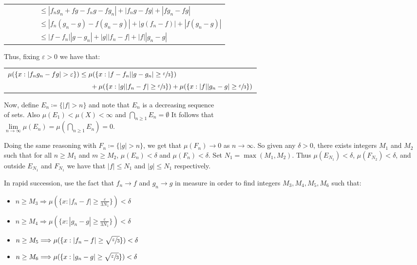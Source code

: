 \documentclass{book}
\newcommand{\exPP}{%
   \color{RedViolet}%
   \fontsize{12}{14}\selectfont%
}
\newenvironment{myIndent}{%
   \begin{adjustwidth}{2.5em}{0em}%
}{%
   \end{adjustwidth}%
}
\newcommand{\retTwo}{\hfill\bigbreak}
\begin{document}
\begin{enumerate}
\begin{myIndent}
{\begin{tabular}{l}
			$\phantom{|f_ng_n - fg|} \leq |f_ng_n + fg - f_ng - fg_n| + |f_ng - fg| + |fg_n - fg|$\\ [3pt]

			$\phantom{|f_ng_n - fg|} \leq |f_n(g_n - g) - f(g_n - g)| + |g(f_n - f)| + |f(g_n - g)|$\\ [3pt]

			$\phantom{|f_ng_n - fg|} \leq |f - f_n||g - g_n| + |g||f_n - f| + |f||g_n - g|$
		\end{tabular} \retTwo\par}

		Thus, fixing $\varepsilon > 0$ we have that:

		{\centering\exPP
		\begin{tabular}{l}
			$\mu(\{x : |f_ng_n - fg| > \varepsilon\}) \leq \mu(\{x : |f - f_n||g - g_n| \geq \sfrac{\varepsilon}{3}\})$\\
			$\phantom{\mu(\{x : |f_ng_n - fg| > \varepsilon\}) aaa} + \mu(\{x : |g||f_n - f| \geq \sfrac{\varepsilon}{3}\}) + \mu(\{x : |f||g_n - g| \geq \sfrac{\varepsilon}{3}\})$
		\end{tabular} \retTwo\par}

		Now, define $E_n \coloneq \{|f| > n\}$ and note that $E_n$ is a decreasing sequence\\ of sets. Also $\mu(E_1) < \mu(X) < \infty$ and $\bigcap\limits_{n \geq 1} E_n = \emptyset$ It follows that\\ [-8pt] $\lim\limits_{n \rightarrow \infty}\mu(E_n) = \mu(\bigcap\limits_{n \geq 1} E_n) = 0$.\retTwo

		Doing the same reasoning with $F_n \coloneq \{|g| > n\}$, we get that $\mu(F_n) \rightarrow 0$ as $n \rightarrow \infty$. So given any $\delta > 0$, there exists integers $M_1$ and $M_2$ such that for all $n \geq M_1$ and $m \geq M_2$, $\mu(E_n) < \delta$ and $\mu(F_n) < \delta$. Set $N_1 = \max(M_1, M_2)$. Thus $\mu(E_{N_1}) < \delta$, $\mu(F_{N_2}) < \delta$, and outside $E_{N_1}$ and $F_{N_1}$ we have that $|f| \leq N_1$ and $|g| \leq N_1$ respectively.\retTwo

		In rapid succession, use the fact that $f_n \rightarrow f$ and $g_n \rightarrow g$ in measure in order to find integers $M_3, M_4, M_5, M_6$ such that:

		\begin{itemize}
			\item $n \geq M_3 \Longrightarrow \mu(\{x : |f_n - f| \geq \frac{\varepsilon}{3N_1}\}) < \delta$
			\item $n \geq M_4 \Longrightarrow \mu(\{x : |g_n - g| \geq \frac{\varepsilon}{3N_1}\}) < \delta$
			\item $n \geq M_5 \Longrightarrow \mu(\{x : |f_n - f| \geq \sqrt{\sfrac{\varepsilon}{3}}\}) < \delta$
			\item $n \geq M_6 \Longrightarrow \mu(\{x : |g_n - g| \geq \sqrt{\sfrac{\varepsilon}{3}}\}) < \delta$
		\end{itemize}


\end{myIndent}
\end{enumerate}
\end{document}
